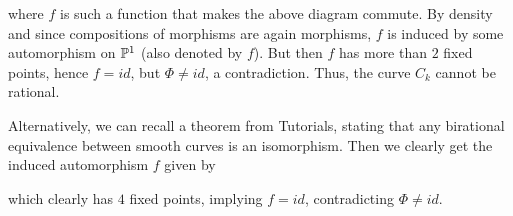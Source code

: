 \documentclass[a4paper, 12pt]{article}
\begin{document}
\begin{Exercise}
\begin{enumerate}[label=(\roman*)]
             where $f$ is such a function that makes the above diagram commute.
             By density and since compositions of morphisms are again
             morphisms, $f$ is induced by some automorphism on $\P^1$ (also
             denoted by $f$).  But then $f$ has more than $2$ fixed points,
             hence $f = id$, but $\Phi \neq id$, a contradiction.  Thus, the
             curve $C_k$ cannot be rational.

             Alternatively, we can recall a theorem from Tutorials,
             stating that any birational equivalence between smooth curves is an isomorphism.
             Then we clearly get the induced automorphism $f$ given by

             which clearly has $4$ fixed points, implying $f = id$, contradicting $\Phi \neq id$.
     \end{enumerate}
 \end{Exercise}
\end{document}
